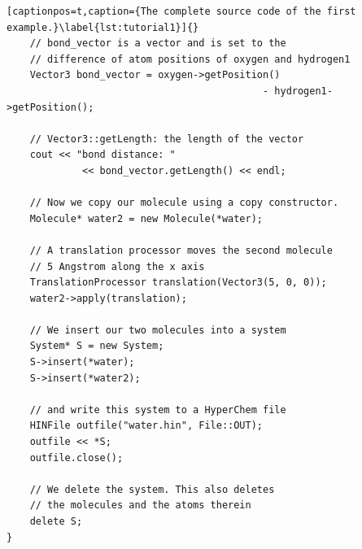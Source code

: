 \begin{lstlisting}[captionpos=t,caption={The complete source code of the first example.}\label{lst:tutorial1}]{}
	// bond_vector is a vector and is set to the
	// difference of atom positions of oxygen and hydrogen1
	Vector3 bond_vector = oxygen->getPosition() 
											- hydrogen1->getPosition();

	// Vector3::getLength: the length of the vector
	cout << "bond distance: " 
			 << bond_vector.getLength() << endl;

	// Now we copy our molecule using a copy constructor.
	Molecule* water2 = new Molecule(*water);

	// A translation processor moves the second molecule
	// 5 Angstrom along the x axis
	TranslationProcessor translation(Vector3(5, 0, 0));
	water2->apply(translation);

	// We insert our two molecules into a system
	System* S = new System;
	S->insert(*water);
	S->insert(*water2);

	// and write this system to a HyperChem file
	HINFile outfile("water.hin", File::OUT);
	outfile << *S;
	outfile.close();

	// We delete the system. This also deletes 
	// the molecules and the atoms therein
	delete S;
}
\end{lstlisting}
